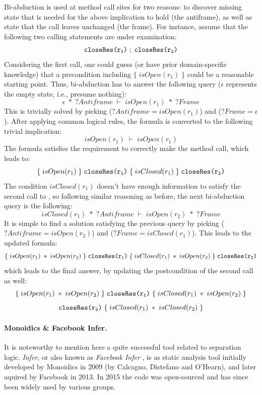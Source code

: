 Bi-abduction is used at method call sites for two reasons: to discover missing state that is needed for the above implication to hold (the antiframe), as well as state that the call leaves unchanged (the frame). For instance, assume that the following two calling statements are under examination:
\[
\texttt{closeRes(r\textsubscript{1})} \; ; \; \texttt{closeRes(r\textsubscript{2})}
\]
Considering the first call, one could guess (or have prior domain-specific knowledge) that a precondition including $\{\; isOpen(r_1) \;\}$ could be a reasonable starting point. Thus, bi-abduction has to answer the following query ($\epsilon$ represents the empty state, i.e., presume nothing):
\[
\epsilon \; * \; ?Antiframe \; \vdash \; isOpen(r_1) \; * \; ?Frame
\]
This is trivially solved by picking ($?Antiframe = isOpen(r_1)$) and ($?Frame = \epsilon$). After applying common logical rules, the formula is converted to the following trivial implication:
\[
isOpen(r_1) \; \vdash \; isOpen(r_1)
\]
The formula satisfies the requirement to correctly make the method call, which leads to:
\[
\{ \; isOpen(r_1) \; \} \; \texttt{closeRes(r\textsubscript{1})} \; \{ \; isClosed(r_1) \; \} \; \texttt{closeRes(r\textsubscript{2})}
\]
The condition $isClosed(r_1)$ doesn't have enough information to satisfy the second call to , so following similar reasoning as before, the next bi-abduction query is the following:
\[
isClosed(r_1) \; * \; ?Antiframe \; \vdash \; isOpen(r_2) \; * \; ?Frame
\]
It is simple to find a solution satisfying the previous query by picking ($?Antiframe = isOpen(r_2)$) and ($?Frame = isClosed(r_1)$). This leads to the updated formula:
\[
\{ \; isOpen(r_1) \; * \; isOpen(r_2) \; \} \; \texttt{closeRes(r\textsubscript{1})} \; \{ \; isClosed(r_1) \; * \; isOpen(r_2) \; \} \; \texttt{closeRes(r\textsubscript{2})}
\]
which leads to the final answer, by updating the postcondition of the second call as well:
\[
\{ \; isOpen(r_1) \; * \; isOpen(r_2) \; \} \; \texttt{closeRes(r\textsubscript{1})} \; \{ \; isClosed(r_1) \; * \; isOpen(r_2) \; \}
\]
\[
\texttt{closeRes(r\textsubscript{2})} \; \{ \; isClosed(r_1) \; * \; isClosed(r_2) \; \}
\]


\paragraph{Monoidics \& Facebook Infer.}
It is noteworthy to mention here a quite successful tool related to separation logic. \emph{Infer}, or also known as \emph{Facebook Infer} \cite{nfm:2015:Calcagno}, is as static analysis tool initially developed by Monoidics in 2009 (by Calcagno, Distefano and O'Hearn), and later aquired by Facebook in 2013. In 2015 the code was open-sourced and has since been widely used by various groups.

